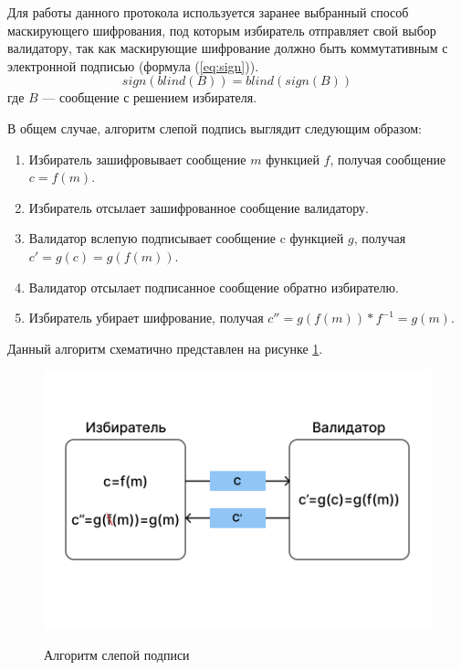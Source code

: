 Для работы данного протокола используется заранее выбранный способ маскирующего шифрования, под которым избиратель отправляет свой выбор валидатору, так как маскирующие шифрование должно быть коммутативным с электронной подписью (формула (\ref{eq:sign})).
\begin{equation}\label{eq:sign}
sign(blind(B))=blind(sign(B))
\end{equation}
где  $B$ — сообщение с решением избирателя.

В общем случае, алгоритм слепой подпись выглядит следующим образом:

\begin{enumerate} 
  \item Избиратель зашифровывает сообщение $m$ функцией $f$, получая сообщение \(c=f(m)\).
  
  \item Избиратель отсылает зашифрованное сообщение валидатору.
  
  \item Валидатор вслепую подписывает сообщение c функцией $g$, получая \(c'=g(c)=g(f(m))\).
  
  \item Валидатор отсылает подписанное сообщение обратно избирателю.
  
  \item Избиратель убирает шифрование, получая \(c''=g(f(m))*f^{-1}=g(m)\).
\end{enumerate}

Данный алгоритм схематично представлен на рисунке \ref{fig:masksign}.

\begin{figure}[H]
\begin{center}
\includegraphics[width=0.9\hsize]{fig/mask-sign.png}\\[2mm]
\caption{Алгоритм слепой подписи}\label{fig:masksign}
\end{center}
\end{figure}

